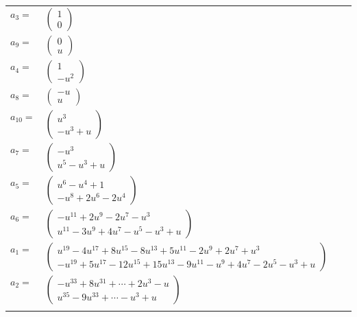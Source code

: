 \documentclass[1p]{elsarticle_modified}
\theoremstyle{definition}
\begin{document}
\begin{tabular}{m{7pt} m{180pt} m{7pt} m{180pt} }
\flushright $a_{3}=$&$\begin{pmatrix}1\\0\end{pmatrix}$ \\
\flushright $a_{9}=$&$\begin{pmatrix}0\\u\end{pmatrix}$ \\
\flushright $a_{4}=$&$\begin{pmatrix}1\\- u^2\end{pmatrix}$ \\
\flushright $a_{8}=$&$\begin{pmatrix}- u\\u\end{pmatrix}$ \\
\flushright $a_{10}=$&$\begin{pmatrix}u^3\\- u^3+u\end{pmatrix}$ \\
\flushright $a_{7}=$&$\begin{pmatrix}- u^3\\u^5- u^3+u\end{pmatrix}$ \\
\flushright $a_{5}=$&$\begin{pmatrix}u^6- u^4+1\\- u^8+2 u^6-2 u^4\end{pmatrix}$ \\
\flushright $a_{6}=$&$\begin{pmatrix}- u^{11}+2 u^9-2 u^7- u^3\\u^{11}-3 u^9+4 u^7- u^5- u^3+u\end{pmatrix}$ \\
\flushright $a_{1}=$&$\begin{pmatrix}u^{19}-4 u^{17}+8 u^{15}-8 u^{13}+5 u^{11}-2 u^9+2 u^7+u^3\\- u^{19}+5 u^{17}-12 u^{15}+15 u^{13}-9 u^{11}- u^9+4 u^7-2 u^5- u^3+u\end{pmatrix}$ \\
\flushright $a_{2}=$&$\begin{pmatrix}- u^{33}+8 u^{31}+\cdots+2 u^3- u\\u^{35}-9 u^{33}+\cdots- u^3+u\end{pmatrix}$\\&\end{tabular}
\end{document}
